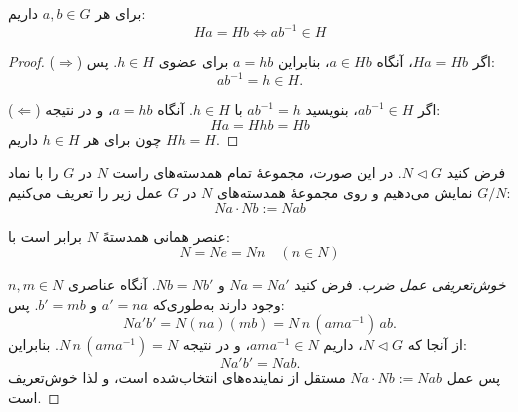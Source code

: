 \begin{frame}
    \begin{remark}
        برای هر $a,b \in G$ داریم:
        \[
            Ha = Hb \iff ab^{-1} \in H
        \]
    \end{remark}

    \begin{proof}
        (\(\Rightarrow\)) اگر \(Ha = Hb\)، آنگاه \(a \in Hb\)، بنابراین \(a = hb\) برای عضوی \(h \in H\). پس:
        \[
            ab^{-1} = h \in H.
        \]

        (\(\Leftarrow\)) اگر \(ab^{-1} \in H\)، بنویسید \(ab^{-1} = h\) با \(h \in H\). آنگاه \(a = hb\)، و در نتیجه:
        \[
            Ha = Hhb = Hb
        \]
        چون برای هر \(h \in H\) داریم \(Hh = H\).
    \end{proof}

\end{frame}


\begin{frame}
    \begin{definition}
        فرض کنید $N \triangleleft G$. در این صورت، مجموعهٔ تمام همدسته‌های راست $N$ در $G$ را با نماد $G / N$ نمایش می‌دهیم و روی مجموعهٔ همدسته‌های $N$ در $G$ عمل زیر را تعریف می‌کنیم:
        \[
            Na \cdot Nb := Nab
        \]

        عنصر همانی همدستهً $N$ برابر است با:
        \[
            N = Ne = Nn \quad (n \in N)
        \]
    \end{definition}

    \begin{proof}[خوش‌تعریفی عمل ضرب]
        فرض کنید \(Na = Na'\) و \(Nb = Nb'\). آنگاه عناصری \(n, m \in N\) وجود دارند به‌طوری‌که
        \(a' = na\) و \(b' = mb\). پس:
        \[
            Na'b' = N(na)(mb) = N\,n\,(a m a^{-1})\,ab.
        \]
        از آنجا که \(N \triangleleft G\)، داریم \(a m a^{-1} \in N\)، و در نتیجه
        \(N\,n\,(a m a^{-1}) = N\). بنابراین:
        \[
            Na'b' = N ab.
        \]
        پس عمل \(Na \cdot Nb := Nab\) مستقل از نماینده‌های انتخاب‌شده است،
        و لذا خوش‌تعریف است.
    \end{proof}


\end{frame}


